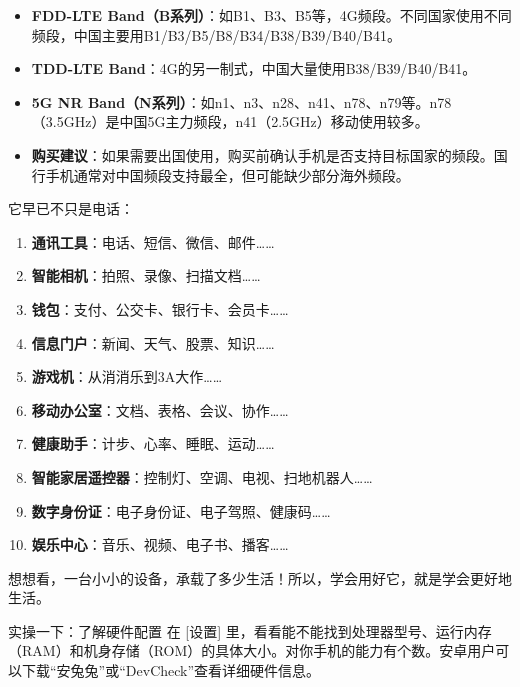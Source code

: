 \begin{itemize}
  \item \textbf{FDD-LTE Band（B系列）}：如B1、B3、B5等，4G频段。不同国家使用不同频段，中国主要用B1/B3/B5/B8/B34/B38/B39/B40/B41。
  \item \textbf{TDD-LTE Band}：4G的另一制式，中国大量使用B38/B39/B40/B41。
  \item \textbf{5G NR Band（N系列）}：如n1、n3、n28、n41、n78、n79等。n78（3.5GHz）是中国5G主力频段，n41（2.5GHz）移动使用较多。
  \item \textbf{购买建议}：如果需要出国使用，购买前确认手机是否支持目标国家的频段。国行手机通常对中国频段支持最全，但可能缺少部分海外频段。
\end{itemize}


它早已不只是电话：

\begin{enumerate}
  \item \textbf{通讯工具}：电话、短信、微信、邮件……
  \item \textbf{智能相机}：拍照、录像、扫描文档……
  \item \textbf{钱包}：支付、公交卡、银行卡、会员卡……
  \item \textbf{信息门户}：新闻、天气、股票、知识……
  \item \textbf{游戏机}：从消消乐到3A大作……
  \item \textbf{移动办公室}：文档、表格、会议、协作……
  \item \textbf{健康助手}：计步、心率、睡眠、运动……
  \item \textbf{智能家居遥控器}：控制灯、空调、电视、扫地机器人……
  \item \textbf{数字身份证}：电子身份证、电子驾照、健康码……
  \item \textbf{娱乐中心}：音乐、视频、电子书、播客……
\end{enumerate}

想想看，一台小小的设备，承载了多少生活！所以，学会用好它，就是学会更好地生活。

\begin{tcbpractice}{实操一下：了解硬件配置}
在 [设置] 里，看看能不能找到处理器型号、运行内存（RAM）和机身存储（ROM）的具体大小。对你手机的能力有个数。安卓用户可以下载“安兔兔”或“DevCheck”查看详细硬件信息。

\end{tcbpractice}
